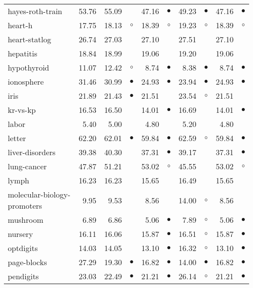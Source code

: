 {\begin{longtable}{lrr@{\hspace{0.1cm}}cr@{\hspace{0.1cm}}cr@{\hspace{0.1cm}}cr@{\hspace{0.1cm}}c}
hayes-roth-train & 53.76 & 55.09 &           & 47.16 & $\bullet$ & 49.23 &  $\bullet$ & 47.16 & $\bullet$\\
heart-h & 17.75 & 18.13 &   $\circ$ & 18.39 &   $\circ$ & 19.23 &    $\circ$ & 18.39 &   $\circ$\\
heart-statlog & 26.74 & 27.03 &           & 27.10 &           & 27.51 &            & 27.10 &          \\
hepatitis & 18.84 & 18.99 &           & 19.06 &           & 19.20 &            & 19.06 &          \\
hypothyroid & 11.07 & 12.42 &   $\circ$ &  8.74 & $\bullet$ &  8.38 &  $\bullet$ &  8.74 & $\bullet$\\
ionosphere & 31.46 & 30.99 & $\bullet$ & 24.93 & $\bullet$ & 23.94 &  $\bullet$ & 24.93 & $\bullet$\\
iris & 21.89 & 21.43 & $\bullet$ & 21.51 &           & 23.54 &    $\circ$ & 21.51 &          \\
kr-vs-kp & 16.53 & 16.50 &           & 14.01 & $\bullet$ & 16.69 &            & 14.01 & $\bullet$\\
labor &  5.40 &  5.00 &           &  4.80 &           &  5.20 &            &  4.80 &          \\
letter & 62.20 & 62.01 & $\bullet$ & 59.84 & $\bullet$ & 62.59 &    $\circ$ & 59.84 & $\bullet$\\
liver-disorders & 39.38 & 40.30 &           & 37.31 & $\bullet$ & 39.17 &            & 37.31 & $\bullet$\\
lung-cancer & 47.87 & 51.21 &           & 53.02 &   $\circ$ & 45.55 &            & 53.02 &   $\circ$\\
lymph & 16.23 & 16.23 &           & 15.65 &           & 16.49 &            & 15.65 &          \\
molecular-biology-promoters &  9.95 &  9.53 &           &  8.56 &           & 14.00 &    $\circ$ &  8.56 &          \\
mushroom &  6.89 &  6.86 &           &  5.06 & $\bullet$ &  7.89 &    $\circ$ &  5.06 & $\bullet$\\
nursery & 16.11 & 16.06 &           & 15.87 & $\bullet$ & 16.51 &    $\circ$ & 15.87 & $\bullet$\\
optdigits & 14.03 & 14.05 &           & 13.10 & $\bullet$ & 16.32 &    $\circ$ & 13.10 & $\bullet$\\
page-blocks & 27.29 & 19.30 & $\bullet$ & 16.82 & $\bullet$ & 14.00 &  $\bullet$ & 16.82 & $\bullet$\\
pendigits & 23.03 & 22.49 & $\bullet$ & 21.21 & $\bullet$ & 26.14 &    $\circ$ & 21.21 & $\bullet$\\

\end{longtable}}
